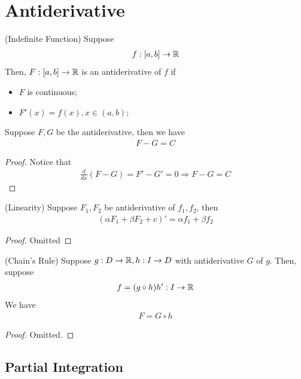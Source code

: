 \documentclass[Total.tex]{subfiles}
\begin{document}
		\section{Antiderivative}
			\begin{Def}
				(Indefinite Function) Suppose 
				\begin{gather*}
					f:[a,b]\rightarrow \mathbb{R}
				\end{gather*}
				Then, $F:[a,b]\rightarrow \mathbb{R}$ is an antiderivative of $f$ if
				\begin{itemize}
					\item $F$ is continuous;
					\item $F'(x)=f(x),x\in (a,b)$;
				\end{itemize}
			\end{Def}	
			\begin{lemma}
				Suppose $F,G$ be the antiderivative, then we have
				\begin{gather*}
					F-G=C
				\end{gather*}
			\end{lemma}
			\begin{proof}
				Notice that
				\begin{gather*}
					\frac{d}{dx}(F-G)=F'-G'=0\Rightarrow F-G=C
				\end{gather*}
			\end{proof}
			\begin{lemma}
				(Linearity) Suppose $F_1,F_2$ be antiderivative of $f_1,f_2$, then
				\begin{gather*}
					(\alpha F_1+\beta F_2+c)'=\alpha f_1+\beta f_2
				\end{gather*}
			\end{lemma}
			\begin{proof}
				Omitted
			\end{proof}
			\begin{lemma}
				(Chain's Rule) Suppose $g:D\rightarrow \mathbb{R},h:I\rightarrow D$ with antiderivative $G$ of $g$. Then, suppose
				\begin{gather*}
					f=(g\circ h)h':I\rightarrow \mathbb{R}
				\end{gather*}
				We have
				\begin{gather*}
					F=G\circ h
				\end{gather*}
			\end{lemma}
			\begin{proof}
				Omitted.
			\end{proof}
			
			\subsection{Partial Integration}
			
\end{document}
